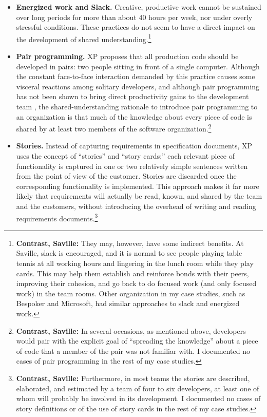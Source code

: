 \begin{itemize}
\item \textbf{Energized work and Slack.} Creative, productive work cannot be sustained over long periods for more than about 40 hours per week, nor under overly stressful conditions. These practices do not seem to have a direct impact on the development of shared understanding.\footnote{\textbf{Contrast, Saville:} They may, however, have some indirect benefits. At Saville, slack is encouraged, and it is normal to see people playing table tennis at all working hours and lingering in the lunch room while they play cards. This may help them establish and reinforce bonds with their peers, improving their cohesion, and go back to do focused work (and only focused work) in the team rooms. Other organization in my case studies, such as Bespoker and Microsoft, had similar approaches to slack and energized work.}

\item \textbf{Pair programming.} XP proposes that all production code should be developed in pairs: two people sitting in front of a single computer. Although the constant face-to-face interaction demanded by this practice causes some visceral reactions among solitary developers, and although pair programming has not been shown to bring direct productivity gains to the development team \cite{Arisholm2007}, the shared-understanding rationale to introduce pair programming to an organization is that much of the knowledge about every piece of code is shared by at least two members of the software organization.\footnote{\textbf{Contrast, Saville:} In several occasions, as mentioned above, developers would pair with the explicit goal of ``spreading the knowledge'' about a piece of code that a member of the pair was not familiar with. I documented no cases of pair programming in the rest of my case studies.}

\item \textbf{Stories.} Instead of capturing requirements in specification documents, XP uses the concept of ``stories'' and ``story cards;'' each relevant piece of functionality is captured in one or two relatively simple sentences written from the point of view of the customer. Stories are discarded once the corresponding functionality is implemented. This approach makes it far more likely that requirements will actually be read, known, and shared by the team and the customers, without introducing the overhead of writing and reading requirements documents.\footnote{\textbf{Contrast, Saville:} Furthermore, in most teams the stories are described, elaborated, and estimated by a team of four to six developers, at least one of whom will probably be involved in its development. I documented no cases of story definitions or of the use of story cards in the rest of my case studies.}


\end{itemize}
